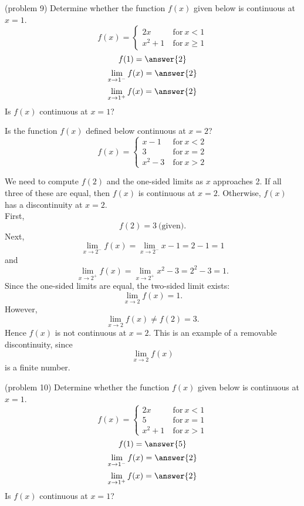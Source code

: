 \documentclass{ximera}
\begin{document}
\begin{problem}(problem 9)
Determine whether the function $f(x)$ given below is continuous at $x = 1$.
\[
f(x) = \left\{
     \begin{array}{lr}
       2x & \ \text{for} \  x < 1 \\
       x^2 + 1 & \ \text{for} \ x \geq 1
     \end{array}
   \right.
\]
\[
f(1) = \answer{2}
\]
\[
\lim_{x \to 1^-} f(x) = \answer{2}
\]
\[
\lim_{x \to 1^+} f(x) = \answer{2}
\]
Is $f(x)$ continuous at $x = 1$?
\begin{multipleChoice}
\end{multipleChoice}
\end{problem}




\begin{example}[example 10]
Is the function $f(x)$ defined below continuous at $x = 2$?
\[
f(x) = \left\{
     \begin{array}{lr}
       x-1 & \ \text{for} \  x < 2 \\
			 3 & \ \text{for} \  x = 2 \\
       x^2 - 3 & \ \text{for} \ x > 2
     \end{array}
   \right.
\]


We need to  compute $f(2)$ and the one-sided limits as $x$ approaches 2.
If all three of these are equal, then $f(x)$ is continuous at $x=2$.
Otherwise, $f(x)$ has a discontinuity at $x=2$.\\
First, 
\[
f(2) = 3 \ \text{(given)}.
\]
Next, 
\[
\lim_{x \to 2^-} f(x) = \lim_{x \to 2^-} x-1 = 2-1 = 1
\]
and
\[
\lim_{x \to 2^+} f(x) = \lim_{x \to 2^+} x^2 - 3 = 2^2 - 3 = 1.
\]
Since the one-sided limits are equal, the two-sided limit exists:
\[
\lim_{x \to 2} f(x) = 1.
\]
However,
\[
\lim_{x \to 2} f(x) \neq f(2) = 3.
\]
Hence $f(x)$ is not continuous at $x = 2$.
This is an example of a removable discontinuity, since 
\[\lim_{x \to 2} f(x) \]
is a finite number.
\end{example}


\begin{problem}(problem 10)
Determine whether the function $f(x)$ given below is continuous at $x = 1$.
\[
f(x) = \left\{
     \begin{array}{lr}
       2x & \ \text{for} \  x < 1 \\
			 5 & \ \text{for} \  x = 1 \\
       x^2 + 1 & \ \text{for} \ x > 1
     \end{array}
   \right.
\]
\[
f(1) = \answer{5}
\]
\[
\lim_{x \to 1^-} f(x) = \answer{2}
\]
\[
\lim_{x \to 1^+} f(x) = \answer{2}
\]
Is $f(x)$ continuous at $x = 1$?
\begin{multipleChoice}
\end{multipleChoice}
\end{problem}
\end{document}
